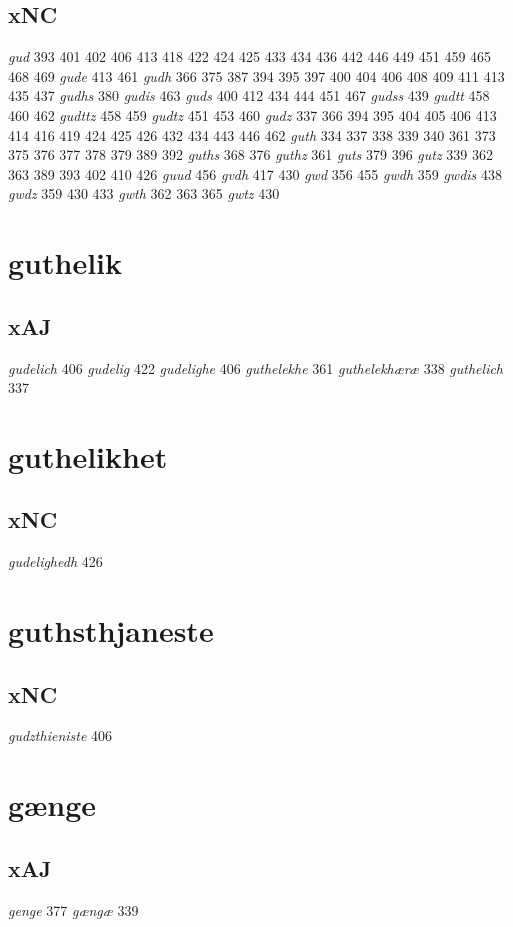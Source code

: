 \documentclass[a4paper,twocolumn]{article}
\begin{document}
\subsection{xNC}
\label{sec:org19e16da}
\emph{gud} 393 401 402 406 413 418 422 424 425 433 434 436 442 446 449 451 459 465 468 469 \emph{gude} 413 461 \emph{gudh} 366 375 387 394 395 397 400 404 406 408 409 411 413 435 437 \emph{gudhs} 380 \emph{gudis} 463 \emph{guds} 400 412 434 444 451 467 \emph{gudss} 439 \emph{gudtt} 458 460 462 \emph{gudttz} 458 459 \emph{gudtz} 451 453 460 \emph{gudz} 337 366 394 395 404 405 406 413 414 416 419 424 425 426 432 434 443 446 462 \emph{guth} 334 337 338 339 340 361 373 375 376 377 378 379 389 392 \emph{guths} 368 376 \emph{guthz} 361 \emph{guts} 379 396 \emph{gutz} 339 362 363 389 393 402 410 426 \emph{guud} 456 \emph{gvdh} 417 430 \emph{gwd} 356 455 \emph{gwdh} 359 \emph{gwdis} 438 \emph{gwdz} 359 430 433 \emph{gwth} 362 363 365 \emph{gwtz} 430 
\section{guthelik}
\label{sec:orgd029c85}
\subsection{xAJ}
\label{sec:org3e17748}
\emph{gudelich} 406 \emph{gudelig} 422 \emph{gudelighe} 406 \emph{guthelekhe} 361 \emph{guthelekhæræ} 338 \emph{guthelich} 337 
\section{guthelikhet}
\label{sec:org8de957a}
\subsection{xNC}
\label{sec:org8a029d8}
\emph{gudelighedh} 426 
\section{guthsthjaneste}
\label{sec:org0e55634}
\subsection{xNC}
\label{sec:orgb4cbd5d}
\emph{gudzthieniste} 406 
\section{gænge}
\label{sec:orgfbdd233}
\subsection{xAJ}
\label{sec:org1374592}
\emph{genge} 377 \emph{gængæ} 339 
\end{document}
